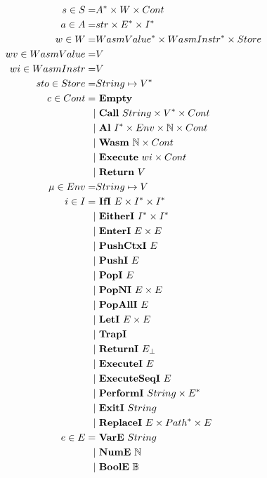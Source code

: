 \begin{align*}
%
  s \in S =& \seq A \times W \times Cont \\
%
  a \in A =& str \times \seq E \times \seq I \\
%
  w \in W =& \seq{WasmValue} \times \seq{WasmInstr} \times Store \\
  wv \in WasmValue =& V \\
  wi \in WasmInstr =& V \\
%
  sto \in Store =& String \mapsto \seq V \\
%
  c \in Cont =& ~ \mt \\
    | & ~ \call ~ String \times \seq V \times Cont \\
    | & ~ \al ~ \seq I \times Env \times \mathbb N \times Cont \\
    | & ~ \wasm ~ \mathbb N \times Cont \\
    | & ~ \exe ~ wi \times Cont \\
    | & ~ \ret ~ V \\
%
  \mu \in Env =& String \mapsto V \\
%
  i \in I =& ~ \ifi ~ E \times \seq I \times \seq I \\
    | & ~ \eitheri ~ \seq I \times \seq I \\
    | & ~ \enteri ~ E \times E \\
    | & ~ \pushctxi ~ E \\
    | & ~ \pushi ~ E \\
    | & ~ \popi ~ E \\
    | & ~ \popni ~ E \times E \\
    | & ~ \popalli ~ E \\
    | & ~ \leti ~ E \times E \\
    | & ~ \trapi \\
    | & ~ \returni ~ E_{\bot} \\
    | & ~ \executei ~ E \\
    | & ~ \executeseqi ~ E \\
    | & ~ \performi ~ String \times \seq{E} \\
    | & ~ \exiti ~ String \\
    | & ~ \replacei ~ E \times \seq{Path} \times E \\
%
  e \in E =& ~ \vare ~ String \\
    | & ~ \nume ~ \mathbb N \\
    | & ~ \boole ~ \mathbb B \\

\end{align*}
